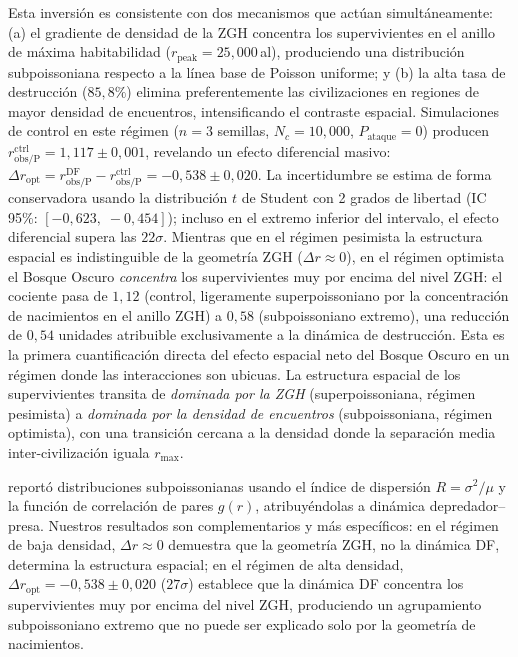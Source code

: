 \documentclass[11pt,a4paper,onecolumn]{article}
\begin{document}
\begin{table}[h]
Esta inversión es consistente con dos mecanismos que actúan
simultáneamente: (a) el gradiente de densidad de la ZGH concentra
los supervivientes en el anillo de máxima habitabilidad
($r_\text{peak} = 25{,}000$\,al), produciendo una distribución
subpoissoniana respecto a la línea base de Poisson uniforme; y
(b) la alta tasa de destrucción ($85{,}8\%$) elimina preferentemente
las civilizaciones en regiones de mayor densidad de encuentros,
intensificando el contraste espacial.
Simulaciones de control en este régimen ($n = 3$ semillas, $N_c =
10{,}000$, $P_\text{ataque} = 0$) producen
$r_\text{obs/P}^\text{ctrl} = 1{,}117 \pm 0{,}001$, revelando un efecto
diferencial masivo:
$\Delta r_\text{opt} = r_\text{obs/P}^\text{DF} -
r_\text{obs/P}^\text{ctrl} = -0{,}538 \pm 0{,}020$.
La incertidumbre se estima de forma conservadora usando la distribución
$t$ de Student con 2 grados de libertad (IC 95\%:
$[-0{,}623,\; -0{,}454]$); incluso en el extremo inferior del intervalo,
el efecto diferencial supera las $22\sigma$.
Mientras que en el régimen pesimista la estructura espacial es
indistinguible de la geometría ZGH ($\Delta r \approx 0$), en el
régimen optimista el Bosque Oscuro \emph{concentra} los supervivientes
muy por encima del nivel ZGH: el cociente pasa de $1{,}12$ (control,
ligeramente superpoissoniano por la concentración de nacimientos en el
anillo ZGH) a $0{,}58$ (subpoissoniano extremo), una reducción de
$0{,}54$ unidades atribuible exclusivamente a la dinámica de
destrucción.
Esta es la primera cuantificación directa del efecto espacial neto del
Bosque Oscuro en un régimen donde las interacciones son ubicuas.
La estructura espacial de los supervivientes transita de
\emph{dominada por la ZGH} (superpoissoniana, régimen pesimista) a
\emph{dominada por la densidad de encuentros} (subpoissoniana, régimen
optimista), con una transición cercana a la densidad donde la
separación media inter-civilización iguala $r_\text{max}$.

\citet{foucher2023} reportó distribuciones subpoissonianas usando el
índice de dispersión $R = \sigma^2/\mu$ y la función de correlación de
pares $g(r)$, atribuyéndolas a dinámica depredador--presa.
Nuestros resultados son complementarios y más específicos: en el régimen
de baja densidad, $\Delta r \approx 0$ demuestra que la geometría ZGH,
no la dinámica DF, determina la estructura espacial; en el régimen de
alta densidad, $\Delta r_\text{opt} = -0{,}538 \pm 0{,}020$ ($27\sigma$)
establece que la dinámica DF concentra los supervivientes muy por encima
del nivel ZGH, produciendo un agrupamiento subpoissoniano extremo que
no puede ser explicado solo por la geometría de nacimientos.


\end{table}
\end{document}
